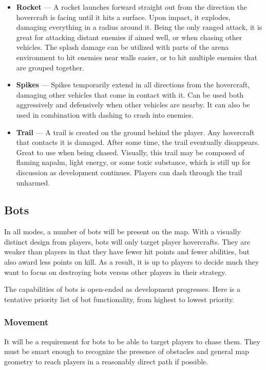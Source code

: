 \documentclass{article}
\theoremstyle{definition}
\begin{document}
\begin{itemize}
  \item \textbf{Rocket} --- A rocket launches forward straight out from the
    direction the hovercraft is facing until it hits a surface. Upon impact, it
    explodes, damaging everything in a radius around it. Being the only ranged
    attack, it is great for attacking distant enemies if aimed well, or when
    chasing other vehicles. The splash damage can be utilized with parts of the
    arena environment to hit enemies near walls easier, or to hit multiple
    enemies that are grouped together.
  \item \textbf{Spikes} --- Spikes temporarily extend in all directions from
    the hovercraft, damaging other vehicles that come in contact with it. Can
    be used both aggressively and defensively when other vehicles are nearby.
    It can also be used in combination with dashing to crash into enemies.
  \item \textbf{Trail} --- A trail is created on the ground behind the player.
    Any hovercraft that contacts it is damaged. After some time, the trail
    eventually disappears. Great to use when being chased. Visually, this trail
    may be composed of flaming napalm, light energy, or some toxic substance,
    which is still up for discussion as development continues. Players can dash
    through the trail unharmed.
\end{itemize}

\subsection{Bots}

In all modes, a number of bots will be present on the map. With a visually
distinct design from players, bots will only target player hovercrafts. They
are weaker than players in that they have fewer hit points and fewer abilities,
but also award less points on kill. As a result, it is up to players to decide
much they want to focus on destroying bots versus other players in their
strategy.

The capabilities of bots is open-ended as development progresses. Here is
a tentative priority list of bot functionality, from highest to lowest
priority.

\subsubsection{Movement}

It will be a requirement for bots to be able to target players to chase them.
They must be smart enough to recognize the presence of obstacles and general
map geometry to reach players in a reasonably direct path if possible.
\end{document}
